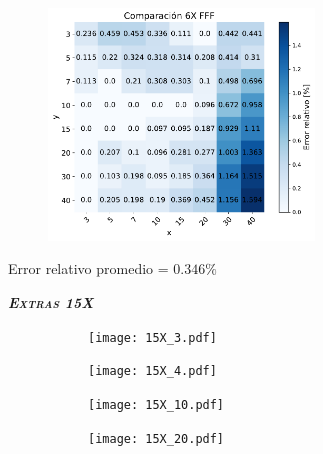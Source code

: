 \documentclass[aspectratio=169,xcolor=dvipsnames,t]{beamer}
\begin{document}
\begin{frame}

      \begin{figure}
            \centering
            \includegraphics[width=0.63\textwidth]{6FFF_hm2.pdf}
      \end{figure}

      \vspace{-20pt}
      \begin{flushright}
      \tiny{Error relativo promedio = $0.346 \%$}
      \end{flushright}

\end{frame}



\begin{frame}[standout]
      \centering\LARGE
      \textbf{\itshape\scshape Extras 15X}
\end{frame}

\begin{frame}
      \vspace{1cm}
      \begin{figure}
            \centering
            \begin{subfigure}[b]{0.49\linewidth}
                  \texttt{[image: 15X\_3.pdf]}
            \end{subfigure}
            \begin{subfigure}[b]{0.49\linewidth}
                  \texttt{[image: 15X\_4.pdf]}
            \end{subfigure}
      \end{figure}
\end{frame}

\begin{frame}
      \vspace{1cm}
      \begin{figure}
            \centering
            \begin{subfigure}[b]{0.49\linewidth}
                  \texttt{[image: 15X\_10.pdf]}
            \end{subfigure}
            \begin{subfigure}[b]{0.49\linewidth}
                  \texttt{[image: 15X\_20.pdf]}
            \end{subfigure}
      \end{figure}
\end{frame}
\end{document}
